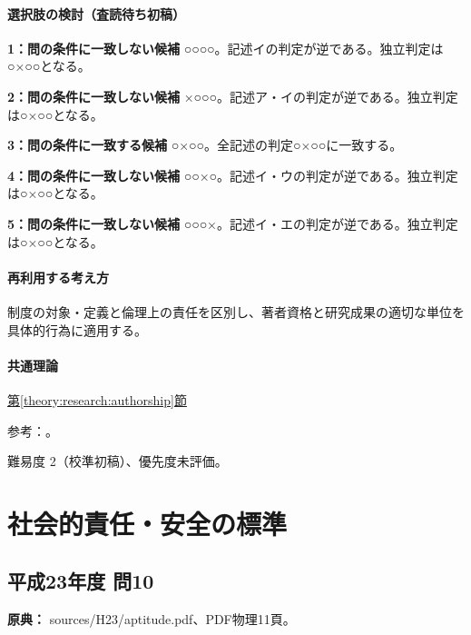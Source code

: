 \paragraph{選択肢の検討（査読待ち初稿）}\mbox{}\par

\noindent\textbf{1：問の条件に一致しない候補} ○○○○。記述イの判定が逆である。独立判定は○×○○となる。\par

\noindent\textbf{2：問の条件に一致しない候補} ×○○○。記述ア・イの判定が逆である。独立判定は○×○○となる。\par

\noindent\textbf{3：問の条件に一致する候補} ○×○○。全記述の判定○×○○に一致する。\par

\noindent\textbf{4：問の条件に一致しない候補} ○○×○。記述イ・ウの判定が逆である。独立判定は○×○○となる。\par

\noindent\textbf{5：問の条件に一致しない候補} ○○○×。記述イ・エの判定が逆である。独立判定は○×○○となる。\par

\paragraph{再利用する考え方} 制度の対象・定義と倫理上の責任を区別し、著者資格と研究成果の適切な単位を具体的行為に適用する。

\paragraph{共通理論} \hyperref[theory:research:authorship]{第\ref*{theory:research:authorship}節}

\par 参考：\cite{jsps_integrity2025}。

\par 難易度 2（校準初稿）、優先度未評価。

\section{社会的責任・安全の標準}

\subsection{平成23年度 問10}
\label{q:h23-reg-apt-10}

\noindent\textbf{原典：} sources/H23/aptitude.pdf、PDF物理11頁。

